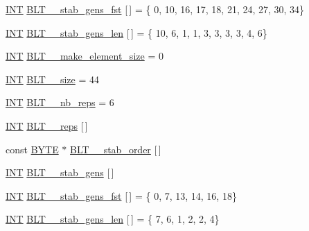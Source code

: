 \begin{DoxyCompactItemize}
\item 
\mbox{\hyperlink{galois_8h_a09fddde158a3a20bd2dcadb609de11dc}{I\+NT}} \mbox{\hyperlink{data___b_l_t_8_c_a96479435bd43c77e54ee2e0ac3c92a30}{B\+L\+T\+\_\+\_\+stab\+\_\+gens\+\_\+fst}} \mbox{[}$\,$\mbox{]} = \{ 0, 10, 16, 17, 18, 21, 24, 27, 30, 34\}
\item 
\mbox{\hyperlink{galois_8h_a09fddde158a3a20bd2dcadb609de11dc}{I\+NT}} \mbox{\hyperlink{data___b_l_t_8_c_aa86c745788cc9f9102817db5103c7825}{B\+L\+T\+\_\+\_\+stab\+\_\+gens\+\_\+len}} \mbox{[}$\,$\mbox{]} = \{ 10, 6, 1, 1, 3, 3, 3, 3, 4, 6\}
\item 
\mbox{\hyperlink{galois_8h_a09fddde158a3a20bd2dcadb609de11dc}{I\+NT}} \mbox{\hyperlink{data___b_l_t_8_c_ac62535b5af139043e3c3383d3fd34152}{B\+L\+T\+\_\+\_\+make\+\_\+element\+\_\+size}} = 0
\item 
\mbox{\hyperlink{galois_8h_a09fddde158a3a20bd2dcadb609de11dc}{I\+NT}} \mbox{\hyperlink{data___b_l_t_8_c_a1a13d91f47f0f3fe827b2d0514123235}{B\+L\+T\+\_\+\_\+size}} = 44
\item 
\mbox{\hyperlink{galois_8h_a09fddde158a3a20bd2dcadb609de11dc}{I\+NT}} \mbox{\hyperlink{data___b_l_t_8_c_aeec9be310b31b11a36d796bd7ec55666}{B\+L\+T\+\_\+\_\+nb\+\_\+reps}} = 6
\item 
\mbox{\hyperlink{galois_8h_a09fddde158a3a20bd2dcadb609de11dc}{I\+NT}} \mbox{\hyperlink{data___b_l_t_8_c_ad79a7155216f8d6f6db4bad92bfae2e3}{B\+L\+T\+\_\+\_\+reps}} \mbox{[}$\,$\mbox{]}
\item 
const \mbox{\hyperlink{galois_8h_ab6cc7b4aeb6ea31aba2b3fbfc83ff5e6}{B\+Y\+TE}} $\ast$ \mbox{\hyperlink{data___b_l_t_8_c_ae6c61a698000e7fd4d7f1aff42effc6e}{B\+L\+T\+\_\+\_\+stab\+\_\+order}} \mbox{[}$\,$\mbox{]}
\item 
\mbox{\hyperlink{galois_8h_a09fddde158a3a20bd2dcadb609de11dc}{I\+NT}} \mbox{\hyperlink{data___b_l_t_8_c_a7f3e68e072db48eb6d2c8f96eb344df2}{B\+L\+T\+\_\+\_\+stab\+\_\+gens}} \mbox{[}$\,$\mbox{]}
\item 
\mbox{\hyperlink{galois_8h_a09fddde158a3a20bd2dcadb609de11dc}{I\+NT}} \mbox{\hyperlink{data___b_l_t_8_c_a8d3574ad5efc5f69a8d892b11f69090c}{B\+L\+T\+\_\+\_\+stab\+\_\+gens\+\_\+fst}} \mbox{[}$\,$\mbox{]} = \{ 0, 7, 13, 14, 16, 18\}
\item 
\mbox{\hyperlink{galois_8h_a09fddde158a3a20bd2dcadb609de11dc}{I\+NT}} \mbox{\hyperlink{data___b_l_t_8_c_a17832f402d2fbd45c0f22b704e9a9505}{B\+L\+T\+\_\+\_\+stab\+\_\+gens\+\_\+len}} \mbox{[}$\,$\mbox{]} = \{ 7, 6, 1, 2, 2, 4\}
\item 

\end{DoxyCompactItemize}
